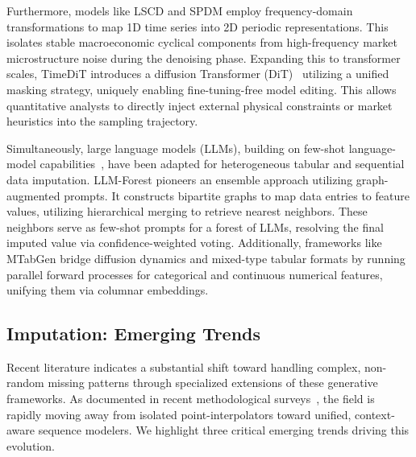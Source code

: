 Furthermore, models like LSCD \citep{fons2025lscd} and SPDM \citep{SPDM} employ frequency-domain transformations to map 1D time series into 2D periodic representations. This isolates stable macroeconomic cyclical components from high-frequency market microstructure noise during the denoising phase. Expanding this to transformer scales, TimeDiT \citep{cao2024timedit} introduces a diffusion Transformer (DiT)~\citep{peebles2023scalable} utilizing a unified masking strategy, uniquely enabling fine-tuning-free model editing. This allows quantitative analysts to directly inject external physical constraints or market heuristics into the sampling trajectory.

Simultaneously, large language models (LLMs), building on few-shot language-model capabilities~\citep{brown2020language}, have been adapted for heterogeneous tabular and sequential data imputation. LLM-Forest \citep{chen2023llmforest} pioneers an ensemble approach utilizing graph-augmented prompts. It constructs bipartite graphs to map data entries to feature values, utilizing hierarchical merging to retrieve nearest neighbors. These neighbors serve as few-shot prompts for a forest of LLMs, resolving the final imputed value via confidence-weighted voting. Additionally, frameworks like MTabGen \citep{liu2023mtabgen} bridge diffusion dynamics and mixed-type tabular formats by running parallel forward processes for categorical and continuous numerical features, unifying them via columnar embeddings.

\subsection{Imputation: Emerging Trends}

Recent literature indicates a substantial shift toward handling complex, non-random missing patterns through specialized extensions of these generative frameworks. As documented in recent methodological surveys~\citep{wang2024mtsisurvey,richter2024survey}, the field is rapidly moving away from isolated point-interpolators toward unified, context-aware sequence modelers. We highlight three critical emerging trends driving this evolution.

